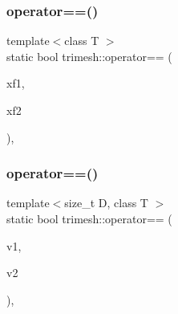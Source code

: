 \mbox{\label{namespacetrimesh_a536dfd53ef4e9b9aaa2e886c080ff64a}} 
\subsubsection{\texorpdfstring{operator==()}{operator==()}\hspace{0.1cm}{\footnotesize\ttfamily [2/3]}}
{\footnotesize\ttfamily template$<$class T $>$ \\
static bool trimesh\+::operator== (\begin{DoxyParamCaption}\item[{const \hyperlink{classtrimesh_1_1XForm}{X\+Form}$<$ T $>$ \&}]{xf1,  }\item[{const \hyperlink{classtrimesh_1_1XForm}{X\+Form}$<$ T $>$ \&}]{xf2 }\end{DoxyParamCaption})\hspace{0.3cm}{\ttfamily [inline]}, {\ttfamily [static]}}

\mbox{\label{namespacetrimesh_a3653d39ab10a61222d9ce4cd993a263a}} 
\subsubsection{\texorpdfstring{operator==()}{operator==()}\hspace{0.1cm}{\footnotesize\ttfamily [3/3]}}
{\footnotesize\ttfamily template$<$size\+\_\+t D, class T $>$ \\
static bool trimesh\+::operator== (\begin{DoxyParamCaption}\item[{const \hyperlink{classtrimesh_1_1Vec}{Vec}$<$ D, T $>$ \&}]{v1,  }\item[{const \hyperlink{classtrimesh_1_1Vec}{Vec}$<$ D, T $>$ \&}]{v2 }\end{DoxyParamCaption})\hspace{0.3cm}{\ttfamily [inline]}, {\ttfamily [static]}}

\mbox{\label{namespacetrimesh_a51a39c2920a3b4f2d36bf41f29da0001}} 
